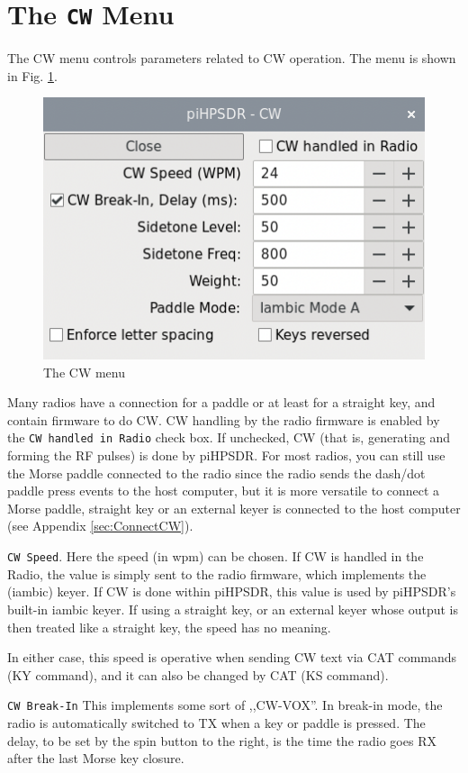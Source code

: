 \documentclass[12pt]{book}
\def\rett#1{\texttt{\color{red}#1}}
\def\pH{pi\-HPSDR\xspace}
\begin{document}
\section{The \texttt{CW} Menu}
The CW menu controls parameters related to CW operation. The menu
is shown in Fig. \ref{fig:CWMenu}.

\begin{figure}[ht]
\center
\includegraphics[scale=0.45]{CWMenu.png}
\caption{The CW menu}
\label{fig:CWMenu}
\end{figure}

Many radios have a connection for a paddle or at least for
a straight key, and contain firmware to do CW. CW handling by
the radio firmware is enabled by the \rett{CW handled in Radio}
check box. If unchecked, CW (that is, generating and forming
the RF pulses) is done by \pH. For most radios, you can
still use the Morse paddle connected to the radio since the
radio sends the dash/dot paddle press events to the host
computer, but it is more versatile to connect
a Morse paddle, straight key or an external keyer is connected
to the host computer (see Appendix \ref{sec:ConnectCW}).

\rett{CW Speed}. Here the speed (in wpm) can be chosen. If CW is
handled in the Radio, the value is simply sent to the radio firmware,
which implements the (iambic) keyer. If CW is done within \pH,
this value is used by \pH's built-in iambic keyer. If using
a straight key, or an external keyer whose output is then treated
like a straight key, the speed has no meaning.

In either case, this speed is operative when sending CW text via
CAT commands (KY command), and it can also be changed by CAT
(KS command).

\rett{CW Break-In} This implements some sort of ,,CW-VOX''. In
break-in mode, the radio is automatically switched to TX when
a key or paddle is pressed. The delay, to be set by the spin
button to the right, is the time the radio goes RX after the
last Morse key closure.
\end{document}
